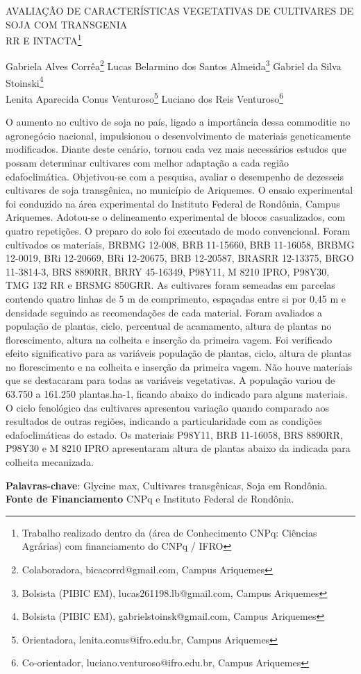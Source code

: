 \documentclass[article,12pt,onesidea,4paper,english,brazil]{abntex2}
\begin{document}
	
	
	\frenchspacing 
	
	\begin{center}
		\LARGE AVALIAÇÃO DE CARACTERÍSTICAS VEGETATIVAS DE CULTIVARES DE SOJA COM TRANSGENIA\\RR E INTACTA\footnote{Trabalho realizado dentro da (área de Conhecimento CNPq: Ciências Agrárias) com financiamento do CNPq / IFRO}
		
		\normalsize
	Gabriela Alves Corrêa\footnote{Colaboradora, bicacorrd@gmail.com, Campus Ariquemes} 
		Lucas Belarmino dos Santos Almeida\footnote{Bolsista (PIBIC EM), lucas261198.lb@gmail.com, Campus Ariquemes} 
		Gabriel da Silva Stoinski\footnote{Bolsista (PIBIC EM), gabrielstoinsk@gmail.com, Campus Ariquemes} \\
		Lenita Aparecida Conus Venturoso\footnote{Orientadora, lenita.conus@ifro.edu.br, Campus Ariquemes} 
		Luciano dos Reis Venturoso\footnote{Co-orientador, luciano.venturoso@ifro.edu.br, Campus Ariquemes}
		
	\end{center}
	
	\noindent O aumento no cultivo de soja no país, ligado a importância dessa commoditie no agronegócio nacional, impulsionou o desenvolvimento de materiais geneticamente modificados. Diante deste cenário, tornou cada vez mais necessários estudos que possam determinar cultivares com melhor adaptação a cada região edafoclimática. Objetivou-se com a pesquisa, avaliar o desempenho de dezesseis cultivares de soja transgênica, no município de Ariquemes. O ensaio experimental foi conduzido na área experimental do Instituto Federal de Rondônia, Campus Ariquemes. Adotou-se o delineamento experimental de blocos casualizados, com quatro repetições. O preparo do solo foi executado de modo convencional. Foram cultivados os materiais, BRBMG 12-008, BRB 11-15660, BRB 11-16058, BRBMG 12-0019, BRi 12-20669, BRi 12-20675, BRB 12-20587, BRASRR 12-13375, BRGO 11-3814-3, BRS 8890RR, BRRY 45-16349, P98Y11, M 8210 IPRO, P98Y30, TMG 132 RR e BRSMG 850GRR. As cultivares foram semeadas em parcelas contendo quatro linhas de 5 m de comprimento, espaçadas entre si por 0,45 m e densidade seguindo as recomendações de cada material. Foram avaliados a população de plantas, ciclo, percentual de acamamento, altura de plantas no florescimento, altura na colheita e inserção da primeira vagem. Foi verificado efeito significativo para as variáveis população de plantas, ciclo, altura de plantas no florescimento e na colheita e inserção da primeira vagem. Não houve materiais que se destacaram para todas as variáveis vegetativas. A população variou de 63.750 a 161.250 plantas.ha-1, ficando abaixo do indicado para alguns materiais. O ciclo fenológico das cultivares apresentou variação quando comparado aos resultados de outras regiões, indicando a particularidade com as condições edafoclimáticas do estado. Os materiais P98Y11, BRB 11-16058, BRS 8890RR, P98Y30 e M 8210 IPRO apresentaram altura de plantas abaixo da indicada para colheita mecanizada.
	
	\vspace{\onelineskip}
	
	\noindent
	\textbf{Palavras-chave}: Glycine max, Cultivares transgênicas, Soja em Rondônia. \\
	\textbf{Fonte de Financiamento} CNPq e Instituto Federal de Rondônia.
	
\end{document}
